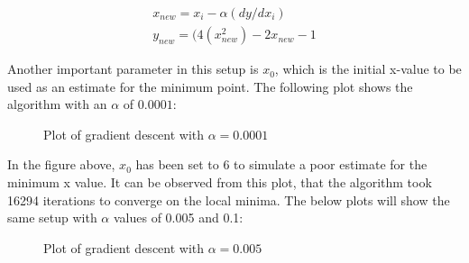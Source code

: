 \begin{eqnarray}
x_{new} = x_{i} - \alpha(dy/{dx_{i}}) \\
y_{new} = (4(x_{new}^{2}) - 2x_{new} - 1  
\end{eqnarray}

\noindent  Another important parameter in this setup is $x_{0}$, which is the initial x-value to be used as an estimate for the minimum point. The following plot shows the algorithm with an $\alpha$ of $0.0001$:

 \begin{figure}
	\begin{center}
	\end{center}
	\caption{Plot of gradient descent with $\alpha = 0.0001$} \label{f:LR0001}
\end{figure}

\noindent In the figure above, $x_{0}$ has been set to 6 to simulate a poor estimate for the minimum x value. It can be observed from this plot, that the algorithm took 16294 iterations to converge on the local minima. The below plots will show the same setup with $\alpha$ values of 0.005 and 0.1: \clearpage

 \begin{figure}
	\begin{center}
	\end{center}
	\caption{Plot of gradient descent with $\alpha = 0.005$} \label{f:LR005}
\end{figure}


